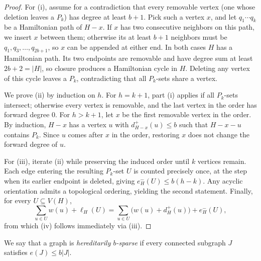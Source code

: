 \documentclass[10pt]{article}
\theoremstyle{compactplain}
\theoremstyle{remark}\newtheorem{remark}[theorem]{Remark}
\begin{document}
\begin{proof}
For (i), assume for a contradiction that every removable vertex (one
whose deletion leaves a $P_k$) has degree at least $b+1$. Pick such a
vertex $x$, and let $q_1\cdots q_k$ be a Hamiltonian path of $H-x$. If
$x$ has two consecutive neighbors on this path, we insert $x$ between
them; otherwise its at least $b+1$ neighbors must be
$q_1,q_3,\ldots,q_{2b+1}$, so $x$ can be appended at either end. In both
cases $H$ has a Hamiltonian path. Its two endpoints are removable and
have degree sum at least $2b+2=|H|$, so closure produces a Hamiltonian
cycle in $H$. Deleting any vertex of this cycle leaves a $P_k$,
contradicting that all $P_k$-sets share a vertex.

We prove (ii) by induction on $h$. For $h=k+1$, part (i) applies if all
$P_k$-sets intersect; otherwise every vertex is removable, and the last
vertex in the order has forward degree $0$. For $h>k+1$, let $x$ be the
first removable vertex in the order. By induction, $H-x$ has a vertex
$u$ with $d_{H-x}^+(u)\le b$ such that $H-x-u$ contains $P_k$. Since $u$
comes after $x$ in the order, restoring $x$ does not change the forward
degree of $u$.

For (iii), iterate (ii) while preserving the induced order until $k$
vertices remain. Each edge entering the resulting $P_k$-set $U$ is
counted precisely once, at the step when its earlier endpoint is
deleted, giving $e_H^-(U)\le b(h-k)$. Any acyclic orientation admits a
topological ordering, yielding the second statement. Finally, for every
$U\subseteq V(H)$,
\begin{equation}\label{eq:weighted-identity}
 \sum_{u\in U}w(u)+\ell_H(U)
 =\sum_{u\in U}\bigl(w(u)+d_H^+(u)\bigr)+e_H^-(U),
\end{equation}
from which (iv) follows immediately via (iii).
\end{proof}

We say that a graph is \emph{hereditarily $b$-sparse} if every connected
subgraph $J$ satisfies $e(J)\le b|J|$.
\end{document}
